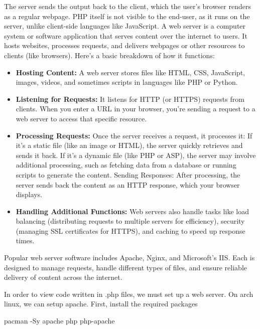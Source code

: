 \documentclass{report}
\begin{document}
    \bigbreak \noindent 
    The server sends the output back to the client, which the user’s browser renders as a regular webpage.
    \bigbreak \noindent 
    PHP itself is not visible to the end-user, as it runs on the server, unlike client-side languages like JavaScript.
    \bigbreak \noindent 
    A web server is a computer system or software application that serves content over the internet to users. It hosts websites, processes requests, and delivers webpages or other resources to clients (like browsers). Here's a basic breakdown of how it functions:
    \begin{itemize}
        \item \textbf{Hosting Content:} A web server stores files like HTML, CSS, JavaScript, images, videos, and sometimes scripts in languages like PHP or Python.
        \item \textbf{Listening for Requests:} It listens for HTTP (or HTTPS) requests from clients. When you enter a URL in your browser, you're sending a request to a web server to access that specific resource.
        \item \textbf{Processing Requests:} Once the server receives a request, it processes it:
        \bigbreak \noindent 
        If it’s a static file (like an image or HTML), the server quickly retrieves and sends it back.
        \bigbreak \noindent 
        If it’s a dynamic file (like PHP or ASP), the server may involve additional processing, such as fetching data from a database or running scripts to generate the content.
        \bigbreak \noindent 
        Sending Responses: After processing, the server sends back the content as an HTTP response, which your browser displays.
        \item \textbf{Handling Additional Functions:} Web servers also handle tasks like load balancing (distributing requests to multiple servers for efficiency), security (managing SSL certificates for HTTPS), and caching to speed up response times.
    \end{itemize}
    Popular web server software includes Apache, Nginx, and Microsoft’s IIS. Each is designed to manage requests, handle different types of files, and ensure reliable delivery of content across the internet.
    



    \pagebreak 
    \bigbreak \noindent 
    In order to view code written in .php files, we must set up a web server. On arch linux, we can setup apache. First, install the required packages
    \bigbreak \noindent 
    \begin{bashcode}
    pacman -Sy apache php php-apache
    \end{bashcode}
\end{document}
